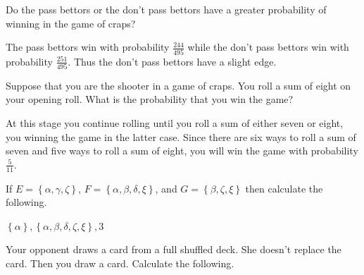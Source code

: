 \documentclass[12pt]{exam}
\begin{document}
\begin{questions}
\question Do the pass bettors or the don't pass bettors have
a greater probability of winning in the game of craps?
\begin{solution} The pass bettors win with probability
$\frac{244}{495}$ while the don't pass bettors win with probability
$\frac{251}{495}$. Thus the don't pass bettors have a slight edge.
\end{solution}

\question Suppose that you are the shooter in a game of craps.
You roll a sum of eight on your opening
roll. What is the probability that you win the game?
\begin{solution} At this stage you continue rolling until
you roll a sum of either seven or eight, you winning the game
in the latter case. Since there are six ways to roll a sum of
seven and five ways to roll a sum of eight,
you will win the game with probability $\frac{5}{11}$.
\end{solution}

\question If $E=\left\{\alpha,\gamma,\zeta\right\}$,
$F=\left\{\alpha,\beta,\delta,\xi\right\}$, and
$G=\left\{\beta,\zeta,\xi\right\}$ then calculate the following.
\begin{solution} $\left\{\alpha\right\},\left\{
\alpha,\beta,\delta,\zeta,\xi\right\},3$
\end{solution}

\question Your opponent draws a card from a full shuffled deck.
She doesn't replace the card.
Then you draw a card. Calculate the following.
\end{questions}
\end{document}
